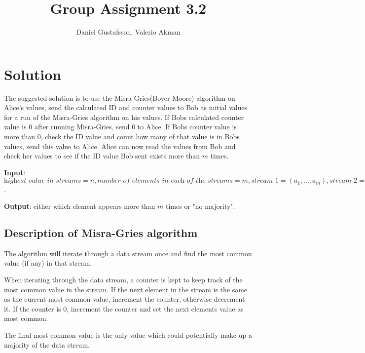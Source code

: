 \documentclass[11pt,a4paper]{article}
\title{Group Assignment 3.2}
\author{Daniel Gustafsson, Valerio Akman}
\begin{document}
\maketitle

\section{Solution}
The suggested solution is to use the Misra-Gries(Boyer-Moore) algorithm on Alice's values, send the calculated ID and counter values to Bob as initial values for a run of the Misra-Gries algorithm on his values. If Bobs calculated counter value is $0$ after running Misra-Gries, send $0$ to Alice. If Bobs counter value is more than $0$, check the ID value and count how many of that value is in Bobs values, send this value to Alice. Alice can now read the values from Bob and check her values to see if the ID value Bob sent exists more than $m$ times.

\vspace{2mm}\noindent\textbf{Input}: $\textit{highest value in streams} = n, \textit{number of elements in each of the streams} = m, \textit{stream 1} = (a_1,...,a_m), \textit{stream 2} = (b_1,...,b_m)$.

\noindent\textbf{Output}: either which element appears more than $m$ times or "no majority".

\subsection{Description of Misra-Gries algorithm}
The algorithm will iterate through a data stream once and find the most common value (if any) in that stream.

When iterating through the data stream, a counter is kept to keep track of the most common value in the stream. If the next element in the stream is the same as the current most common value, increment the counter, otherwise decrement it. If the counter is $0$, increment the counter and set the next elements value as most common. 

The final most common value is the only value which could potentially make up a majority of the data stream.
\end{document}
